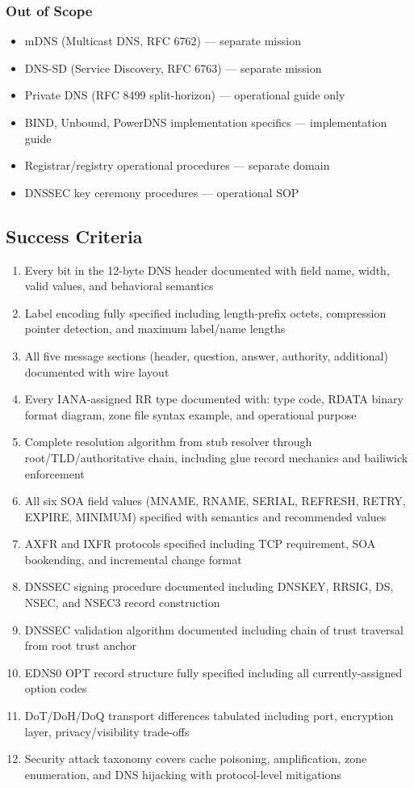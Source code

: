 \documentclass[11pt,letterpaper]{article}
\begin{document}
\subsubsection{Out of Scope}

\begin{itemize}
  \item mDNS (Multicast DNS, RFC 6762) --- separate mission
  \item DNS-SD (Service Discovery, RFC 6763) --- separate mission
  \item Private DNS (RFC 8499 split-horizon) --- operational guide only
  \item BIND, Unbound, PowerDNS implementation specifics --- implementation guide
  \item Registrar/registry operational procedures --- separate domain
  \item DNSSEC key ceremony procedures --- operational SOP
\end{itemize}

\subsection{Success Criteria}

\begin{enumerate}
  \item Every bit in the 12-byte DNS header documented with field name, width, valid values, and behavioral semantics
  \item Label encoding fully specified including length-prefix octets, compression pointer detection, and maximum label/name lengths
  \item All five message sections (header, question, answer, authority, additional) documented with wire layout
  \item Every IANA-assigned RR type documented with: type code, RDATA binary format diagram, zone file syntax example, and operational purpose
  \item Complete resolution algorithm from stub resolver through root/TLD/authoritative chain, including glue record mechanics and bailiwick enforcement
  \item All six SOA field values (MNAME, RNAME, SERIAL, REFRESH, RETRY, EXPIRE, MINIMUM) specified with semantics and recommended values
  \item AXFR and IXFR protocols specified including TCP requirement, SOA bookending, and incremental change format
  \item DNSSEC signing procedure documented including DNSKEY, RRSIG, DS, NSEC, and NSEC3 record construction
  \item DNSSEC validation algorithm documented including chain of trust traversal from root trust anchor
  \item EDNS0 OPT record structure fully specified including all currently-assigned option codes
  \item DoT/DoH/DoQ transport differences tabulated including port, encryption layer, privacy/visibility trade-offs
  \item Security attack taxonomy covers cache poisoning, amplification, zone enumeration, and DNS hijacking with protocol-level mitigations
\end{enumerate}
\end{document}
